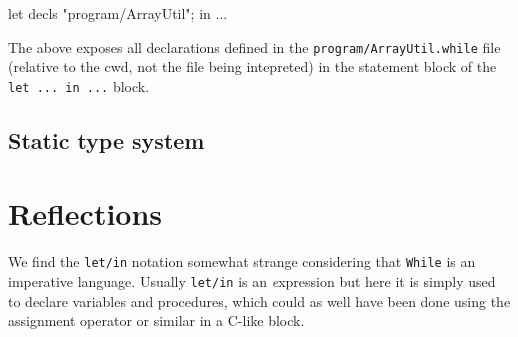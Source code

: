 \documentclass{article}
\begin{document}
\begin{fs}
let decls "program/ArrayUtil"; in ...
\end{fs}

The above exposes all declarations defined in the {\tt program/ArrayUtil.while} file (relative to the cwd, not the file being intepreted) in the statement block of the {\tt let ... in ...} block.

\subsection{Static type system}
\label{sec:type}


\section{Reflections}
We find the {\tt let/in} notation somewhat strange considering that {\tt While} is an imperative language. Usually {\tt let/in} is an {\textit expression} but here it is simply used to declare variables and procedures, which could as well have been done using the assignment operator or similar in a C-like block.
\end{document}
